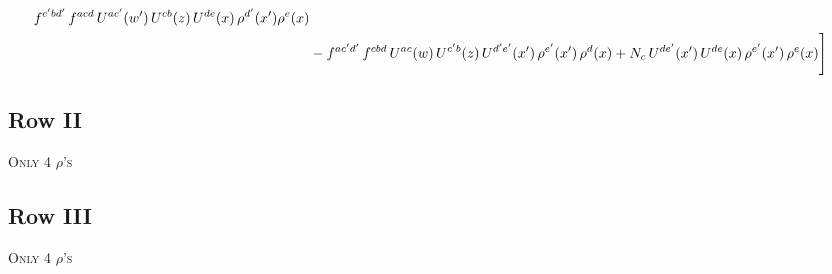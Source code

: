 \documentclass[9pt]{article}
\numberwithin{equation}{section}
\begin{document}
\begin{align}
f^{c'bd'}\,f^{acd}\,U^{ac'}(w')\,U^{cb}(z)\,U^{de}(x)\,\rho^{d'}(x')\rho^{e}(x) \notag \\ & -f^{ac'd'}\,f^{cbd}\,U^{ac}(w)\,U^{c'b}(z)\,U^{d'e'}(x')\,\rho^{e'}(x')\,\rho^{d}(x) +N_{c}\,U^{de'}(x')\,U^{de}(x)\,\rho^{e'}(x')\,\rho^{e}(x)\Bigg]
\end{align}
\subsection{Row II\,}
\textsc{Only 4 $\rho$'s}
\subsection{Row III\,}
\textsc{Only 4 $\rho$'s}
\end{document}
